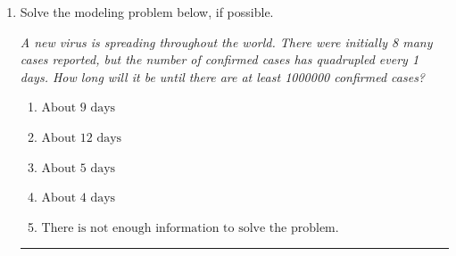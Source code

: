 \documentclass[14pt]{extbook}
\newcommand{\litem}[1]{\item#1\hspace*{-1cm}\rule{\textwidth}{0.4pt}}
\begin{document}
\begin{enumerate}
{\begin{enumerate}[label=\Alph*.]
\end{enumerate} }
\litem{
Solve the modeling problem below, if possible.
\begin{center}
    \textit{ A new virus is spreading throughout the world. There were initially 8 many cases reported, but the number of confirmed cases has quadrupled every 1 days. How long will it be until there are at least 1000000 confirmed cases? }
\end{center}
\begin{enumerate}[label=\Alph*.]
\item \( \text{About } 9 \text{ days} \)
\item \( \text{About } 12 \text{ days} \)
\item \( \text{About } 5 \text{ days} \)
\item \( \text{About } 4 \text{ days} \)
\item \( \text{There is not enough information to solve the problem.} \)

\end{enumerate} }
\end{enumerate}
\end{document}
